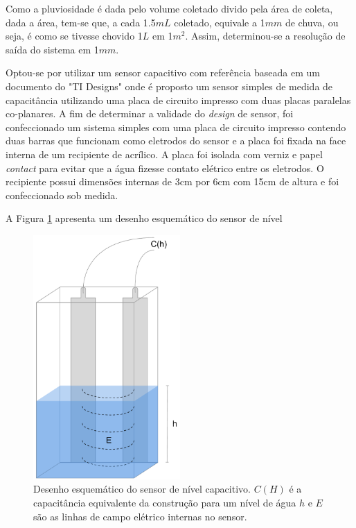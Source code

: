 \documentclass[a4paper]{instrumentacao}
\begin{document}
Como a pluviosidade é dada pelo volume coletado divido pela área de coleta, dada a área, tem-se que, a cada 1.5$mL$ coletado, equivale a 1$mm$ de chuva, ou seja, é como se tivesse chovido 1$L$ em 1$m^2$. Assim, determinou-se a resolução de saída do sistema em 1$mm$.

Optou-se por utilizar um sensor capacitivo com referência baseada em um documento do "TI Designs"\cite{pluviometro-capacitivo-texas} onde é proposto um sensor simples de medida de capacitância utilizando uma placa de circuito impresso com duas placas paralelas co-planares. A fim de determinar a validade do \textit{design} de sensor, foi confeccionado um sistema simples com uma placa de circuito impresso contendo duas barras que funcionam como eletrodos do sensor e a placa foi fixada na face interna de um recipiente de acrílico. A placa foi isolada com verniz e papel \textit{contact} para evitar que a água fizesse contato elétrico entre os eletrodos. O recipiente possui dimensões internas de 3cm por 6cm com 15cm de altura e foi confeccionado sob medida.

A Figura \ref{fig:sensor-nivel-capacitivo} apresenta um desenho esquemático do sensor de nível

\begin{figure}[H]
	\centering \includegraphics[width=0.5\textwidth]{SensorNivelCapacitivo.pdf}
	\caption{Desenho esquemático do sensor de nível capacitivo. $C(H)$ é a capacitância equivalente da construção para um nível de água $h$ e $E$ são as linhas de campo elétrico internas no sensor.}
	\label{fig:sensor-nivel-capacitivo}
\end{figure}
\end{document}
